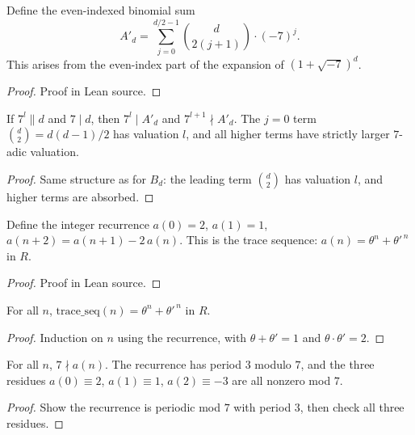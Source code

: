 \begin{definition}
  \label{def:binomial_A'}
  \leanok
  Define the even-indexed binomial sum
  \[
    A'_d = \sum_{j=0}^{d/2-1} \binom{d}{2(j+1)} \cdot (-7)^j.
  \]
  This arises from the even-index part of the expansion of $(1+\sqrt{-7})^d$.
\end{definition}
\begin{proof}\leanok
  Proof in Lean source.
\end{proof}

\begin{lemma}
  \label{lem:even_binomial_valuation}
  \leanok
  If $7^l \| d$ and $7 \mid d$, then $7^l \mid A'_d$ and $7^{l+1} \nmid A'_d$.
  The $j=0$ term $\binom{d}{2} = d(d-1)/2$ has valuation $l$, and all higher terms
  have strictly larger $7$-adic valuation.
\end{lemma}
\begin{proof}\leanok
  Same structure as for $B_d$: the leading term $\binom{d}{2}$ has valuation $l$,
  and higher terms are absorbed.
\end{proof}

\begin{definition}
  \label{def:trace_seq}
  \leanok
  Define the integer recurrence $a(0) = 2$, $a(1) = 1$, $a(n+2) = a(n+1) - 2\,a(n)$.
  This is the trace sequence: $a(n) = \theta^n + \theta'^{\,n}$ in $R$.
\end{definition}
\begin{proof}\leanok
  Proof in Lean source.
\end{proof}

\begin{lemma}
  \label{lem:trace_seq_eq}
  \leanok
  For all $n$, $\mathrm{trace\_seq}(n) = \theta^n + \theta'^{\,n}$ in $R$.
\end{lemma}
\begin{proof}\leanok
  Induction on $n$ using the recurrence, with $\theta + \theta' = 1$ and $\theta \cdot \theta' = 2$.
\end{proof}

\begin{lemma}
  \label{lem:trace_seq_not_dvd_seven}
  \leanok
  For all $n$, $7 \nmid a(n)$. The recurrence has period $3$ modulo $7$,
  and the three residues $a(0) \equiv 2$, $a(1) \equiv 1$, $a(2) \equiv -3$ are all nonzero mod $7$.
\end{lemma}
\begin{proof}\leanok
  Show the recurrence is periodic mod $7$ with period $3$, then check all three residues.
\end{proof}

